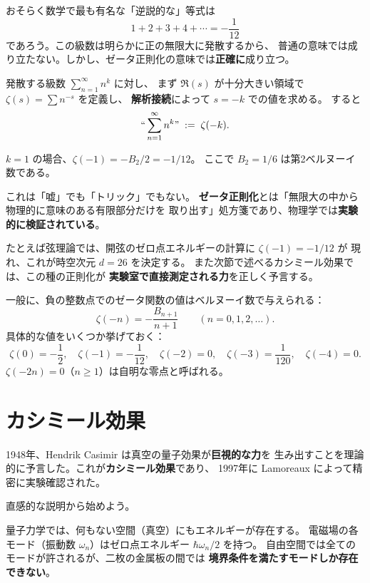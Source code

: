 \documentclass[11pt,a4paper]{article}
\theoremstyle{definition}
\begin{document}
おそらく数学で最も有名な「逆説的な」等式は
\[
  1 + 2 + 3 + 4 + \cdots = -\frac{1}{12}
\]
であろう。この級数は明らかに正の無限大に発散するから、
普通の意味では成り立たない。しかし、ゼータ正則化の意味では\textbf{正確に}成り立つ。

\begin{dfnbox}[ゼータ正則化]
発散する級数 $\sum_{n=1}^{\infty} n^k$ に対し、
まず $\Re(s)$ が十分大きい領域で $\zeta(s) = \sum n^{-s}$ を定義し、
\textbf{解析接続}によって $s = -k$ での値を求める。
すると
\[
  ``\sum_{n=1}^{\infty} n^k" \;:=\; \zeta(-k).
\]
\end{dfnbox}

$k=1$ の場合、$\zeta(-1) = -B_2/2 = -1/12$。
ここで $B_2 = 1/6$ は第2ベルヌーイ数である。

\begin{hsbox}
これは「嘘」でも「トリック」でもない。
\textbf{ゼータ正則化}とは「無限大の中から物理的に意味のある有限部分だけを
取り出す」処方箋であり、物理学では\textbf{実験的に検証されている}。

たとえば弦理論では、開弦のゼロ点エネルギーの計算に $\zeta(-1)=-1/12$ が
現れ、これが時空次元 $d=26$ を決定する。
また次節で述べるカシミール効果では、この種の正則化が
\textbf{実験室で直接測定される力}を正しく予言する。
\end{hsbox}

一般に、負の整数点でのゼータ関数の値はベルヌーイ数で与えられる：
\[
  \zeta(-n) = -\frac{B_{n+1}}{n+1}
  \qquad (n = 0, 1, 2, \ldots).
\]
具体的な値をいくつか挙げておく：
\[
  \zeta(0) = -\frac{1}{2},\quad
  \zeta(-1) = -\frac{1}{12},\quad
  \zeta(-2) = 0,\quad
  \zeta(-3) = \frac{1}{120},\quad
  \zeta(-4) = 0.
\]
$\zeta(-2n)=0$（$n\geq 1$）は自明な零点と呼ばれる。

\section{カシミール効果}
\label{sec:4.2}

1948年、Hendrik Casimir は真空の量子効果が\textbf{巨視的な力}を
生み出すことを理論的に予言した。これが\textbf{カシミール効果}であり、
1997年に Lamoreaux によって精密に実験確認された。

直感的な説明から始めよう。

量子力学では、何もない空間（真空）にもエネルギーが存在する。
電磁場の各モード（振動数 $\omega_n$）はゼロ点エネルギー $\hbar\omega_n/2$ を持つ。
自由空間では全てのモードが許されるが、二枚の金属板の間では
\textbf{境界条件を満たすモードしか存在できない}。
\end{document}
